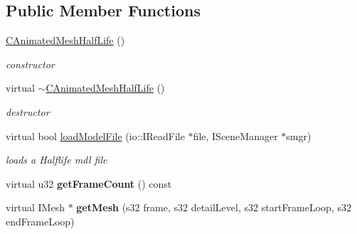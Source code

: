 \subsection*{Public Member Functions}
\begin{DoxyCompactItemize}
\item 
\hypertarget{classirr_1_1scene_1_1_c_animated_mesh_half_life_af1ab4035649f8f49580aa613f7c021b9}{\hyperlink{classirr_1_1scene_1_1_c_animated_mesh_half_life_af1ab4035649f8f49580aa613f7c021b9}{C\-Animated\-Mesh\-Half\-Life} ()}\label{classirr_1_1scene_1_1_c_animated_mesh_half_life_af1ab4035649f8f49580aa613f7c021b9}

\begin{DoxyCompactList}\small\item\em constructor \end{DoxyCompactList}\item 
\hypertarget{classirr_1_1scene_1_1_c_animated_mesh_half_life_af5ee395f293f17a471520f19509284d0}{virtual \hyperlink{classirr_1_1scene_1_1_c_animated_mesh_half_life_af5ee395f293f17a471520f19509284d0}{$\sim$\-C\-Animated\-Mesh\-Half\-Life} ()}\label{classirr_1_1scene_1_1_c_animated_mesh_half_life_af5ee395f293f17a471520f19509284d0}

\begin{DoxyCompactList}\small\item\em destructor \end{DoxyCompactList}\item 
\hypertarget{classirr_1_1scene_1_1_c_animated_mesh_half_life_a958abbd21add0898f3079f2f2a5ba1c1}{virtual bool \hyperlink{classirr_1_1scene_1_1_c_animated_mesh_half_life_a958abbd21add0898f3079f2f2a5ba1c1}{load\-Model\-File} (io\-::\-I\-Read\-File $\ast$file, I\-Scene\-Manager $\ast$smgr)}\label{classirr_1_1scene_1_1_c_animated_mesh_half_life_a958abbd21add0898f3079f2f2a5ba1c1}

\begin{DoxyCompactList}\small\item\em loads a Halflife mdl file \end{DoxyCompactList}\item 
\hypertarget{classirr_1_1scene_1_1_c_animated_mesh_half_life_a01c40341cb1c565059db4fa291029087}{virtual u32 {\bfseries get\-Frame\-Count} () const }\label{classirr_1_1scene_1_1_c_animated_mesh_half_life_a01c40341cb1c565059db4fa291029087}

\item 
\hypertarget{classirr_1_1scene_1_1_c_animated_mesh_half_life_a98b5876c016f33972858027d34301dbf}{virtual I\-Mesh $\ast$ {\bfseries get\-Mesh} (s32 frame, s32 detail\-Level, s32 start\-Frame\-Loop, s32 end\-Frame\-Loop)}\label{classirr_1_1scene_1_1_c_animated_mesh_half_life_a98b5876c016f33972858027d34301dbf}


\end{DoxyCompactItemize}
